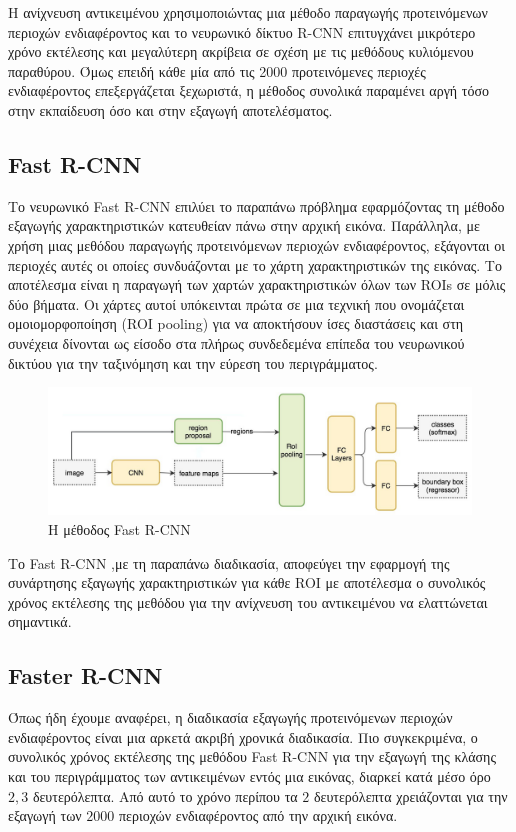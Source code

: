 Η ανίχνευση αντικειμένου χρησιμοποιώντας μια μέθοδο παραγωγής προτεινόμενων περιοχών
ενδιαφέροντος και το νευρωνικό δίκτυο R-CNN επιτυγχάνει μικρότερο χρόνο εκτέλεσης
και μεγαλύτερη ακρίβεια σε σχέση με τις μεθόδους κυλιόμενου παραθύρου. Όμως επειδή
κάθε μία από τις 2000 προτεινόμενες περιοχές ενδιαφέροντος επεξεργάζεται ξεχωριστά,
η μέθοδος συνολικά παραμένει αργή τόσο στην εκπαίδευση όσο και στην εξαγωγή αποτελέσματος.
\subsection{Fast R-CNN}\label{sec:fastrcnn}
Το νευρωνικό Fast R-CNN επιλύει το παραπάνω πρόβλημα εφαρμόζοντας τη μέθοδο
εξαγωγής χαρακτηριστικών κατευθείαν πάνω στην αρχική εικόνα. Παράλληλα, με χρήση
μιας μεθόδου παραγωγής προτεινόμενων περιοχών ενδιαφέροντος, εξάγονται οι περιοχές
αυτές οι οποίες συνδυάζονται με το χάρτη χαρακτηριστικών της εικόνας. Το αποτέλεσμα
είναι η παραγωγή των χαρτών χαρακτηριστικών όλων των ROIs σε μόλις δύο βήματα. Οι
χάρτες αυτοί υπόκεινται πρώτα σε μια τεχνική που ονομάζεται ομοιομορφοποίηση
(ROI pooling) για να αποκτήσουν ίσες διαστάσεις και στη συνέχεια δίνονται ως είσοδο
στα πλήρως συνδεδεμένα επίπεδα του νευρωνικού δικτύου για την ταξινόμηση και την
εύρεση του περιγράμματος.


\begin{figure}[htbp]
  \begin{center}
    \includegraphics[width=1.1\maxwidth]{../figures/fastrcnn2.png}
    \caption{Η μέθοδος Fast R-CNN\label{fig:fastrcnn}}
   \end{center}
\end{figure}

Το Fast R-CNN ,με τη παραπάνω διαδικασία, αποφεύγει
την εφαρμογή της συνάρτησης εξαγωγής χαρακτηριστικών για κάθε ROI με αποτέλεσμα
ο συνολικός χρόνος εκτέλεσης της μεθόδου για την ανίχνευση του αντικειμένου να
ελαττώνεται σημαντικά.
\subsection{Faster R-CNN}\label{sec:fasterrcnn}
Όπως ήδη έχουμε αναφέρει, η διαδικασία εξαγωγής προτεινόμενων περιοχών ενδιαφέροντος
είναι μια αρκετά ακριβή χρονικά διαδικασία. Πιο συγκεκριμένα, ο συνολικός χρόνος
εκτέλεσης της μεθόδου Fast R-CNN για την εξαγωγή της κλάσης και του περιγράμματος
των αντικειμένων εντός μια εικόνας, διαρκεί κατά μέσο όρο $2,3$ δευτερόλεπτα. Από
αυτό το χρόνο περίπου τα $2$ δευτερόλεπτα χρειάζονται για την εξαγωγή των $2000$
περιοχών ενδιαφέροντος από την αρχική εικόνα.

